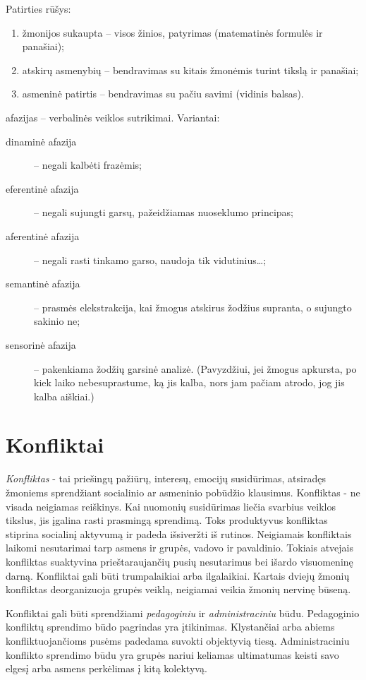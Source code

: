 Patirties rūšys:

\begin{enumerate}
  \item žmonijos sukaupta – visos žinios, patyrimas (matematinės formulės
    ir panašiai);
  \item atskirų asmenybių – bendravimas su kitais žmonėmis turint tikslą
    ir panašiai;
  \item asmeninė patirtis – bendravimas su pačiu savimi (vidinis balsas).
\end{enumerate}

\Glspl{afazija} – verbalinės veiklos sutrikimai. Variantai:

\begin{description}
  \item[dinaminė afazija] – negali kalbėti frazėmis;
  \item[eferentinė afazija] – negali sujungti garsų, pažeidžiamas nuoseklumo
    principas;
  \item[aferentinė afazija] – negali rasti tinkamo garso, naudoja tik
    vidutinius…; %
  \item[semantinė afazija]  – prasmės elekstrakcija, 
    kai žmogus atskirus žodžius supranta, o sujungto sakinio ne;
  \item[sensorinė afazija] – pakenkiama žodžių garsinė analizė. (Pavyzdžiui,
    jei žmogus apkursta, po kiek laiko nebesuprastume, ką jis kalba, nors
    jam pačiam atrodo, jog jis kalba aiškiai.)
\end{description}

\section{Konfliktai}

\label{tema:konfliktai}

\emph{Konfliktas} - tai priešingų pažiūrų, interesų, emocijų susidūrimas, 
atsiradęs žmoniems sprendžiant socialinio ar asmeninio pobūdžio klausimus.
Konfliktas - ne visada neigiamas reiškinys. Kai nuomonių susidūrimas liečia 
svarbius veiklos tikslus, jis įgalina rasti prasmingą sprendimą. Toks 
produktyvus konfliktas stiprina socialinį aktyvumą ir padeda išsiveržti iš
rutinos. Neigiamais konfliktais laikomi nesutarimai tarp asmens ir grupės,
vadovo ir pavaldinio. Tokiais atvejais konfliktas suaktyvina prieštaraujančių
pusių nesutarimus bei išardo visuomeninę darną. Konfliktai gali būti
trumpalaikiai arba ilgalaikiai. Kartais dviejų žmonių konfliktas 
deorganizuoja grupės veiklą, neigiamai veikia žmonių nervinę būseną.

Konfliktai gali būti sprendžiami \emph{pedagoginiu} ir \emph{administraciniu}
būdu. Pedagoginio konfliktų sprendimo būdo pagrindas yra įtikinimas. 
Klystančiai arba abiems konfliktuojančioms pusėms padedama suvokti
objektyvią tiesą. Administraciniu konflikto sprendimo būdu yra grupės
nariui keliamas ultimatumas keisti savo elgesį arba asmens perkėlimas į
kitą kolektyvą.